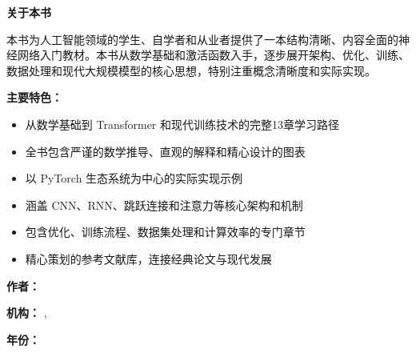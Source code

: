 \newpage
\thispagestyle{empty}

\vspace*{2cm}

\begin{center}
    \Large\textbf{关于本书}
\end{center}

\vspace{1cm}

本书为人工智能领域的学生、自学者和从业者提供了一本结构清晰、内容全面的神经网络入门教材。本书从数学基础和激活函数入手，逐步展开架构、优化、训练、数据处理和现代大规模模型的核心思想，特别注重概念清晰度和实际实现。

\textbf{主要特色：}
\begin{itemize}
    \item 从数学基础到 Transformer 和现代训练技术的完整13章学习路径
    \item 全书包含严谨的数学推导、直观的解释和精心设计的图表
    \item 以 PyTorch 生态系统为中心的实际实现示例
    \item 涵盖 CNN、RNN、跳跃连接和注意力等核心架构和机制
    \item 包含优化、训练流程、数据集处理和计算效率的专门章节
    \item 精心策划的参考文献库，连接经典论文与现代发展
\end{itemize}

\vspace{2cm}

\textbf{作者：} \thesisAuthor

\textbf{机构：} \thesisSchool, \thesisDepartment

\textbf{年份：} \thesisYear

\newpage
